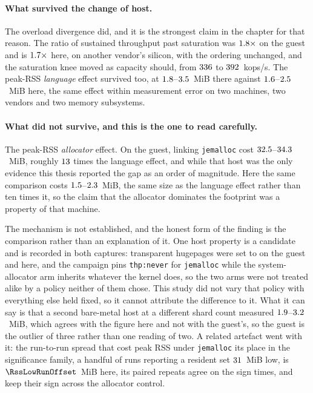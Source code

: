 \documentclass[english,oneside,a4paper,censored,csm,software-track-2020]{HYthesisML}
\begin{document}
\begin{appendices}
\paragraph{What survived the change of host.}
The overload divergence did, and it is the strongest claim in the chapter for that reason. The
ratio of sustained throughput past saturation was $1.8\times$ on the guest and
is $1.7\times$ here, on another vendor's silicon, with the ordering unchanged, and
the saturation knee moved as capacity should, from $336$ to $392$~kops/s. The
peak-RSS \emph{language} effect survived too, at $1.8$--$3.5$~MiB there
against $1.6$--$2.5$~MiB here, the same effect within measurement error on
two machines, two vendors and two memory subsystems.

\paragraph{What did not survive, and this is the one to read carefully.}
The peak-RSS \emph{allocator} effect. On the guest, linking \texttt{jemalloc} cost
$32.5$--$34.3$~MiB, roughly $13$ times the language
effect, and while that host was the only evidence this thesis reported the gap as an order of
magnitude. Here the same comparison costs $1.5$--$2.3$~MiB, the same size
as the language effect rather than ten times it, so the claim that the allocator dominates the
footprint was a property of that machine.

The mechanism is not established, and the honest form of the finding is the comparison rather than
an explanation of it. One host property is a candidate and is recorded in both captures:
transparent hugepages were set to \GuestThp{} on the guest and \MainThp{} here, and the campaign
pins \texttt{thp:never} for \texttt{jemalloc} while the system-allocator arm inherits whatever the
kernel does, so the two arms were not treated alike by a policy neither of them chose. This study
did not vary that policy with everything else held fixed, so it cannot attribute the difference to
it. What it can say is that a second bare-metal host at a different shard count measured
$1.9$--$3.2$~MiB, which agrees with the figure here and not with the guest's,
so the guest is the outlier of three rather than one reading of two. A related artefact went with
it: the run-to-run spread that cost peak RSS under \texttt{jemalloc} its place in the significance
family, a handful of runs reporting a resident set $31$~MiB low, is
$\RssLowRunOffset$~MiB here, its paired repeats agree on the sign \RssAgree{} times, and
\CrossAllocConsistent{} keep their sign across the allocator control.


\end{appendices}
\end{document}
